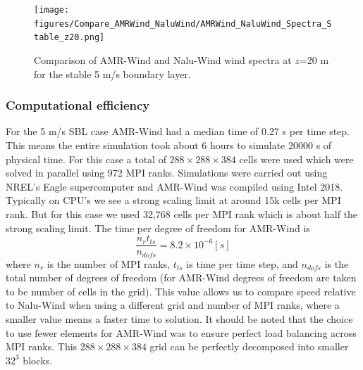 \begin{figure} %
  \centering
  \texttt{[image: figures/Compare\_AMRWind\_NaluWind/AMRWind\_NaluWind\_Spectra\_Stable\_z20.png]}

  \caption{\label{fig:CompareAMRvsNaluSpectra} Comparison of AMR-Wind
    and Nalu-Wind wind spectra at $z$=20 m for the stable 5 m/s boundary
    layer. }
\end{figure}




\subsubsection{Computational efficiency}

For the 5 m/s SBL case AMR-Wind had a median time of 0.27 s per time step.
This means the entire simulation took about 6 hours to simulate 20000 s
of physical time. For this case a total of $288\times 288 \times 384$ cells were used
which were solved in parallel using 972 MPI ranks. Simulations were carried out using NREL's
Eagle supercomputer and AMR-Wind was compiled using Intel 2018.
Typically on CPU's we see a strong scaling limit at around 15k cells per MPI rank.
But for this case we used 32,768 cells per MPI rank which is about half the strong scaling limit.
The time per degree of freedom for AMR-Wind is
\[\frac{n_r t_{ts} }{n_{dofs}} = 8.2\times10^{-6} [s]\]
where $n_r$ is the number of MPI ranks, $t_{ts}$ is time per time step, and $n_{dofs}$ is
the total number of degrees of freedom (for AMR-Wind degrees of freedom are taken to be
 number of cells in the grid). This value allows us to compare speed relative to
Nalu-Wind when using a different grid and number of MPI ranks, where a smaller value
means a faster time to solution. It should be noted that the choice to use fewer
elements for AMR-Wind was to ensure perfect load balancing across MPI ranks. This
$288 \times 288 \times 384$ grid can be perfectly decomposed into smaller $32^3$ blocks.

